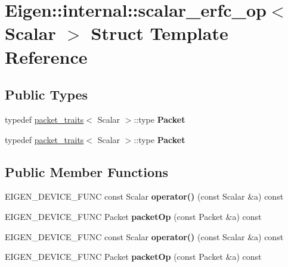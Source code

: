 \hypertarget{struct_eigen_1_1internal_1_1scalar__erfc__op}{}\section{Eigen\+:\+:internal\+:\+:scalar\+\_\+erfc\+\_\+op$<$ Scalar $>$ Struct Template Reference}
\label{struct_eigen_1_1internal_1_1scalar__erfc__op}
\subsection*{Public Types}
\begin{DoxyCompactItemize}
\item 
\mbox{\label{struct_eigen_1_1internal_1_1scalar__erfc__op_aedf202dd7bab0b9c42fd9c295955c814}} 
typedef \hyperlink{struct_eigen_1_1internal_1_1packet__traits}{packet\+\_\+traits}$<$ Scalar $>$\+::type {\bfseries Packet}
\item 
\mbox{\label{struct_eigen_1_1internal_1_1scalar__erfc__op_aedf202dd7bab0b9c42fd9c295955c814}} 
typedef \hyperlink{struct_eigen_1_1internal_1_1packet__traits}{packet\+\_\+traits}$<$ Scalar $>$\+::type {\bfseries Packet}
\end{DoxyCompactItemize}
\subsection*{Public Member Functions}
\begin{DoxyCompactItemize}
\item 
\mbox{\label{struct_eigen_1_1internal_1_1scalar__erfc__op_a530f7bceab2df97d88e5321fdef59335}} 
E\+I\+G\+E\+N\+\_\+\+D\+E\+V\+I\+C\+E\+\_\+\+F\+U\+NC const Scalar {\bfseries operator()} (const Scalar \&a) const
\item 
\mbox{\label{struct_eigen_1_1internal_1_1scalar__erfc__op_abeee081407818d48ce2eadd9c640b204}} 
E\+I\+G\+E\+N\+\_\+\+D\+E\+V\+I\+C\+E\+\_\+\+F\+U\+NC Packet {\bfseries packet\+Op} (const Packet \&a) const
\item 
\mbox{\label{struct_eigen_1_1internal_1_1scalar__erfc__op_a530f7bceab2df97d88e5321fdef59335}} 
E\+I\+G\+E\+N\+\_\+\+D\+E\+V\+I\+C\+E\+\_\+\+F\+U\+NC const Scalar {\bfseries operator()} (const Scalar \&a) const
\item 
\mbox{\label{struct_eigen_1_1internal_1_1scalar__erfc__op_abeee081407818d48ce2eadd9c640b204}} 
E\+I\+G\+E\+N\+\_\+\+D\+E\+V\+I\+C\+E\+\_\+\+F\+U\+NC Packet {\bfseries packet\+Op} (const Packet \&a) const
\end{DoxyCompactItemize}


